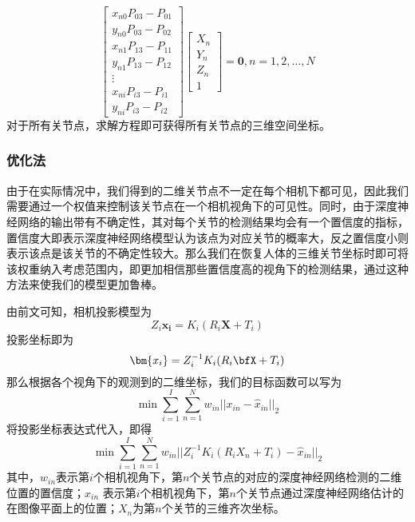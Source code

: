 \begin{equation}
    \left[ \begin{array}{c}
        x_{n0}P_{03} - P_{01} \\ 
        y_{n0}P_{03} - P_{02} \\
        x_{n1}P_{13} - P_{11} \\ 
        y_{n1}P_{13} - P_{12} \\
        \vdots \\
        x_{ni}P_{i3} - P_{i1} \\ 
        y_{ni}P_{i3} - P_{i2} 
    \end{array}\right] \left[ \begin{array}{c}
        X_n \\
        Y_n\\
        Z_n\\
        1 
    \end{array}\right]  = \bm{0}, n = 1,2,\ldots,N
\end{equation}
对于所有关节点，求解方程即可获得所有关节点的三维空间坐标。

\subsubsection{优化法}
由于在实际情况中，我们得到的二维关节点不一定在每个相机下都可见，因此我们需要通过一个权值来控制该关节点在一个相机视角下的可见性。同时，由于深度神经网络的输出带有不确定性，其对每个关节的检测结果均会有一个置信度的指标，置信度大即表示深度神经网络模型认为该点为对应关节的概率大，反之置信度小则表示该点是该关节的不确定性较大。那么我们在恢复人体的三维关节坐标时即可将该权重纳入考虑范围内，即更加相信那些置信度高的视角下的检测结果，通过这种方法来使我们的模型更加鲁棒。

由前文可知，相机投影模型为
\begin{equation}
    Z_i \bm{x_i} = K_i(R_i\bm{X} + T_i)
\end{equation}
投影坐标即为
\begin{equation}
    \bm{x_i} = Z_i^{-1}K_i(R_i\bfX + T_i)    
\end{equation}
那么根据各个视角下的观测到的二维坐标，我们的目标函数可以写为
\begin{equation}
    \min \sum^I_{i=1} \sum_{n=1}^N w_{in}||x_{in} - \hat x_{in}||_2
\end{equation}
将投影坐标表达式代入，即得
\begin{equation}
    \min \sum^I_{i=1} \sum_{n=1}^N w_{in}||Z_i^{-1}K_i(R_iX_n + T_i) - \hat x_{in}||_2  
\end{equation}
\newcommand{\mi}{第\(i\)个}
\newcommand{\mn}{第\(n\)个}
\newcommand{\qczb}{齐次坐标}
其中，$w_{in}$表示\mi 相机视角下，\mn 关节点的对应的深度神经网络检测的二维位置的置信度；$\hat x_{in}$ 表示\mi 相机视角下，\mn 关节点通过深度神经网络估计的在图像平面上的位置；$X_n$为\mn 关节的三维齐次坐标。

